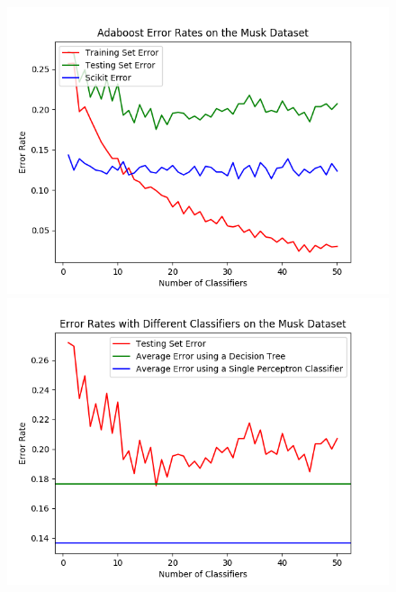 \documentclass{article}
\begin{document}
\begin{figure}[hbt]
\centering
\includegraphics[scale=0.7]{Musk_1}
\includegraphics[scale=0.7]{Musk_different_classifiers_1} 
\caption{}
\end{figure}
\end{document}
